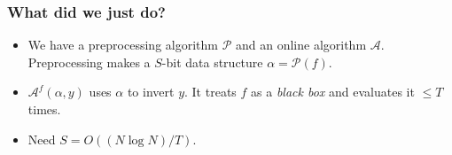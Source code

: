 \documentclass[usenames, dvipsnames, t, table]{beamer}
\newcommand{\A}{\mathcal{A}}
\renewcommand{\P}{\mathcal{P}}
\begin{document}
 \begin{frame}[fragile]
   \frametitle{What did we just do?}
   \begin{itemize}
   \item We have a preprocessing algorithm $\P$ and an online algorithm $\A$. Preprocessing makes a $S$-bit data structure $\alpha = \P(f)$.
     \pause
   \item $\A^f(\alpha, y)$ uses $\alpha$ to invert $y$. It treats $f$ as a \emph{black box} and evaluates it $\leq T$ times.
     \pause
\item Need $S = O((N \log N) / T).$
   \end{itemize}
 \end{frame}
\end{document}
